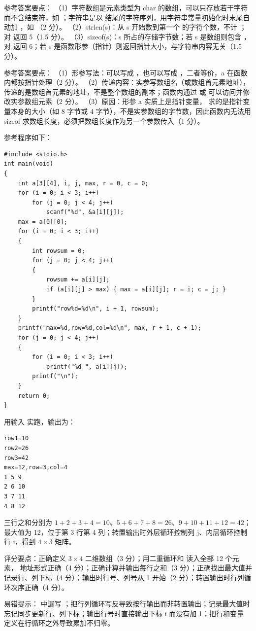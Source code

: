 \documentclass[a4paper,11pt]{article}
\begin{document}
\q 参考答案要点：
（1）字符数组是元素类型为 char 的数组，可以只存放若干字符而不含结束符，如 ；字符串是以  结尾的字符序列，用字符串常量初始化时末尾自动加 ，如 （2 分）。
（2）strlen(s)：从 s 开始数到第一个  的字符个数，不计 ；对  返回 5（1.5 分）。
（3）sizeof(s)：s 所占的存储字节数；若 s 是数组则包含 ，对  返回 6；若 s 是函数形参（指针）则返回指针大小，与字符串内容无关（1.5 分）。

\q 参考答案要点：
（1）形参写法：可以写成 ，也可以写成 ，二者等价，a 在函数内都按指针处理（2 分）。
（2）传递内容：实参写数组名（或数组首元素地址），传递的是数组首元素的地址，不是整个数组的副本；函数内通过  或  可以访问并修改实参数组元素（2 分）。
（3）原因：形参 a 实质上是指针变量， 求的是指针变量本身的大小（如 8 字节或 4 字节），不是实参数组的字节数，因此函数内无法用 sizeof 求数组长度，必须把数组长度作为另一个参数传入（1 分）。


\q 参考程序如下：
\begin{lstlisting}[language={[custom]C}]
#include <stdio.h>
int main(void)
{
    int a[3][4], i, j, max, r = 0, c = 0;
    for (i = 0; i < 3; i++)
        for (j = 0; j < 4; j++)
            scanf("%d", &a[i][j]);
    max = a[0][0];
    for (i = 0; i < 3; i++)
    {
        int rowsum = 0;
        for (j = 0; j < 4; j++)
        {
            rowsum += a[i][j];
            if (a[i][j] > max) { max = a[i][j]; r = i; c = j; }
        }
        printf("row%d=%d\n", i + 1, rowsum);
    }
    printf("max=%d,row=%d,col=%d\n", max, r + 1, c + 1);
    for (j = 0; j < 4; j++)
    {
        for (i = 0; i < 3; i++)
            printf("%d ", a[i][j]);
        printf("\n");
    }
    return 0;
}
\end{lstlisting}
\begin{analysis}用输入  实跑，输出为：
\begin{lstlisting}
row1=10
row2=26
row3=42
max=12,row=3,col=4
1 5 9
2 6 10
3 7 11
4 8 12
\end{lstlisting}
三行之和分别为 $1+2+3+4=10$、$5+6+7+8=26$、$9+10+11+12=42$；最大值为 12，位于第 3 行第 4 列；转置输出时外层循环控制列 j、内层循环控制行 i，得到 $4\times3$ 矩阵。\end{analysis}
\begin{analysis}评分要点：正确定义 $3\times4$ 二维数组（3 分）；用二重循环和  读入全部 12 个元素， 地址形式正确（4 分）；正确计算并输出每行之和（3 分）；正确找出最大值并记录行、列下标（4 分）；输出时行号、列号从 1 开始（2 分）；转置输出时行列循环次序正确（4 分）。\end{analysis}
\begin{analysis}易错提示： 中漏写 \code{\&}；把行列循环写反导致按行输出而非转置输出；记录最大值时忘记同步更新行、列下标；输出行号时直接输出下标 i 而没有加 1；把行和变量  定义在行循环之外导致累加不归零。\end{analysis}
\end{document}
